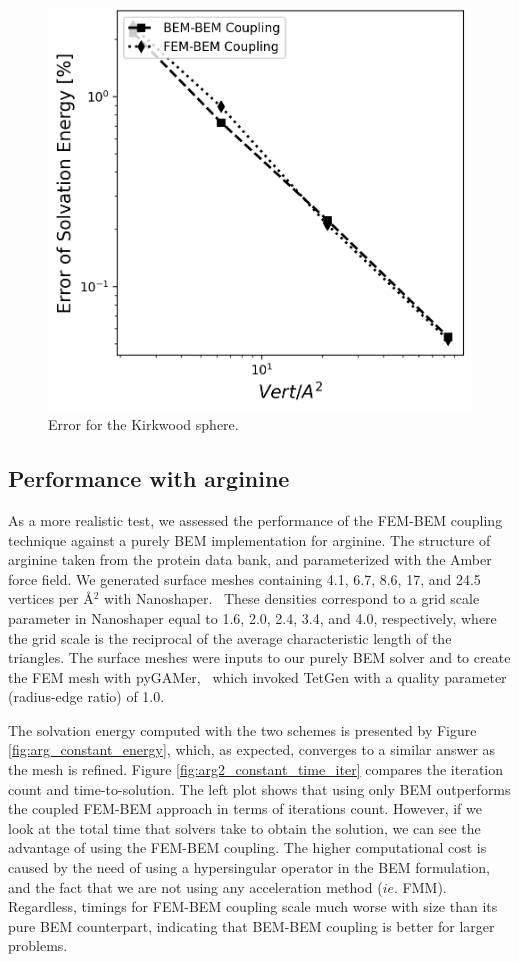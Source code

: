 \begin{figure}
  \centering
  \includegraphics[width=0.5\linewidth]{DolfinX_Sphere_const_coeff_error.png}
  \caption{Error for the Kirkwood sphere.}
  \label{fig:error_sphere}
\end{figure}

\subsection*{\sffamily \large Performance with arginine}

As a more realistic test, we assessed the performance of the FEM-BEM coupling technique against a purely BEM implementation for arginine.
The structure of arginine taken from the protein data bank, and parameterized with the Amber\cite{ponder2003force} force field. 
We generated surface meshes containing 4.1, 6.7, 8.6, 17, and 24.5 vertices per \AA$^2$ with Nanoshaper.~\cite{decherchi2013general}
These densities correspond to a grid scale parameter in Nanoshaper equal to 1.6, 2.0, 2.4, 3.4, and 4.0, respectively, where the grid scale is the reciprocal of the average characteristic length of the triangles.
The surface meshes were inputs to our purely BEM solver and to create the FEM mesh with pyGAMer,~\cite{lee2020open} which invoked TetGen\cite{hang2015tetgen} with a quality parameter (radius-edge ratio) of 1.0.

The solvation energy computed with the two schemes is presented by Figure \ref{fig:arg_constant_energy}, which, as expected, converges to a similar answer as the mesh is refined.
Figure \ref{fig:arg2_constant_time_iter} compares the iteration count and time-to-solution. The left plot shows that using only BEM outperforms the coupled FEM-BEM approach in terms of iterations count. However, if we look at the total time that solvers take to obtain the solution, we can see the advantage of using the FEM-BEM coupling. The higher computational cost is caused by the need of using a hypersingular operator in the BEM formulation, and the fact that we are not using any acceleration method ($ie.$ FMM). Regardless, timings for FEM-BEM coupling scale much worse with size than its pure BEM counterpart, indicating that BEM-BEM coupling is better for larger problems. 


